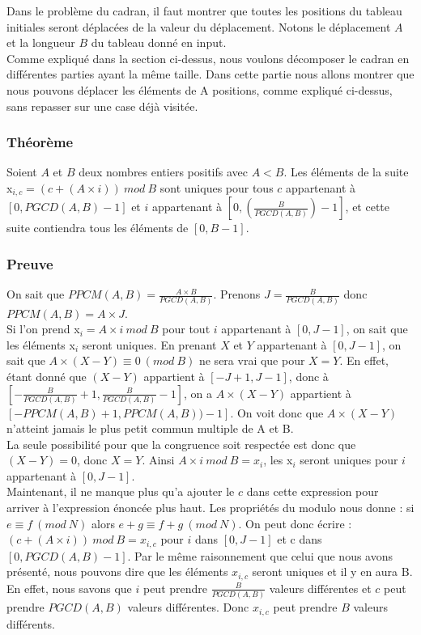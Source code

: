 Dans le problème du cadran, il faut montrer que toutes les positions du tableau initiales seront déplacées de la valeur du déplacement. Notons le déplacement $A$ et la longueur $B$ du tableau donné en input.\\  

Comme expliqué dans la section ci-dessus, nous voulons décomposer le cadran en différentes parties ayant la même taille. Dans cette partie nous allons montrer que nous pouvons déplacer les éléments de A positions, comme expliqué ci-dessus, sans repasser sur une case déjà visitée. 

\subsubsection*{Théorème}
Soient $A$ et $B$ deux nombres entiers positifs avec $A < B$. Les éléments de la suite x$_{i,c} = (c + (A\times i))\ mod\ B$ sont uniques pour tous $c$ appartenant à $[0, PGCD(A,B)-1]$ et $i$ appartenant à $[0, (\frac{B}{PGCD(A,B)})-1]$, et cette suite contiendra tous les éléments de $[0, B-1]$. 

\subsubsection*{Preuve}

On sait que $PPCM(A,B) = \frac{A\times B}{PGCD(A,B)}$. Prenons $J = \frac{B}{PGCD(A,B)}$ donc $PPCM(A,B) = A\times J$.\\

Si l'on prend x$_{i} = A\times i\ mod\ B$ pour tout $i$ appartenant à $[0, J-1]$, on sait que les éléments x$_{i}$ seront uniques. En prenant $X$ et $Y$ appartenant à $[0, J-1]$, on sait que $A\times (X-Y) ≡ 0\ (mod\ B)$ ne sera vrai que pour $X=Y$. En effet, étant donné que $(X-Y)$ appartient à $[-J+1, J-1]$, donc à $[- \frac{B}{PGCD(A,B)} +1,\frac{B}{PGCD(A,B)} -1] $, on a $A\times (X-Y)$ appartient à $[- PPCM(A,B) +1, PPCM(A,B) )-1]$. On voit donc que $A\times (X-Y)$ n'atteint jamais le plus petit commun multiple de A et B.\\
La seule possibilité pour que la congruence soit respectée est donc que $(X-Y) = 0$, donc $X=Y$. Ainsi $A\times i\ mod\ B = x_{i}$, les x$_{i}$ seront uniques pour $i$ appartenant à $[0, J-1]$.\\

Maintenant, il ne manque plus qu'a ajouter le $c$ dans cette expression pour arriver à l'expression énoncée plus haut. Les propriétés du modulo nous donne : si $e ≡ f\ (mod\ N)$ alors $e+g ≡ f+g\ (mod\ N)$. On peut donc écrire : $(c +(A\times i))\ mod\ B = x_{i,c}$ pour $i$ dans $[0, J-1]$ et c dans $[0, PGCD(A,B) -1]$. Par le même raisonnement que celui que nous avons présenté, nous pouvons dire que les éléments $x_{i,c}$ seront uniques et il y en aura B.\\
En effet, nous savons que $i$ peut prendre $\frac{B}{PGCD(A,B)}$ valeurs différentes et $c$ peut prendre $PGCD(A,B)$ valeurs différentes. Donc $x_{i,c}$ peut prendre $B$ valeurs différents.\\


